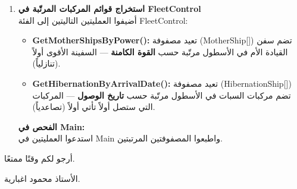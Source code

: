 \documentclass[14pt]{extarticle}
\begin{document}
\begin{enumerate}[resume, label=\textbf{تمرين \arabic*:}, wide=0pt, leftmargin=*, itemsep=2.2em]
    \item \textbf{استخراج قوائم المركبات المرتّبة في \textenglish{FleetControl}} \\
    أضيفوا العمليتين التاليتين إلى الفئة \textenglish{FleetControl}:
    \begin{itemize}
        \item \textbf{\textenglish{GetMotherShipsByPower()}:} تعيد مصفوفة (\textenglish{MotherShip[]}) تضم سفن القيادة الأم في الأسطول مرتّبة حسب \textbf{القوة الكامنة} — السفينة الأقوى أولاً (تنازلياً).
        \item \textbf{\textenglish{GetHibernationByArrivalDate()}:} تعيد مصفوفة (\textenglish{HibernationShip[]}) تضم مركبات السبات في الأسطول مرتّبة حسب \textbf{تاريخ الوصول} — المركبات التي ستصل أولاً تأتي أولاً (تصاعدياً).
    \end{itemize}
    \textbf{الفحص في \textenglish{Main}:} \\
    استدعوا العمليتين في \textenglish{Main} واطبعوا المصفوفتين المرتبتين.

\end{enumerate}

\vspace{1cm}
\begin{flushleft}
أرجو لكم وقتًا ممتعًا.

الأستاذ محمود اغبارية.
\end{flushleft}
\end{document}
